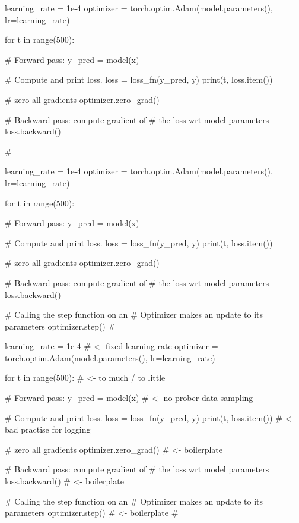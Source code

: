 \documentclass{beamer}
\begin{document}
\begin{frame}[fragile ]
\begin{pythoncode}
learning_rate = 1e-4
optimizer = torch.optim.Adam(model.parameters(), lr=learning_rate)

for t in range(500):

  # Forward pass: 
  y_pred = model(x)

  # Compute and print loss.
  loss = loss_fn(y_pred, y)
  print(t, loss.item())
  
  # zero all gradients
  optimizer.zero_grad()

  # Backward pass: compute gradient of 
  # the loss wrt model parameters
  loss.backward()




#
\end{pythoncode}
\vfill
\end{frame}

\begin{frame}[fragile ]
\begin{pythoncode}
learning_rate = 1e-4
optimizer = torch.optim.Adam(model.parameters(), lr=learning_rate)

for t in range(500):

  # Forward pass: 
  y_pred = model(x)

  # Compute and print loss.
  loss = loss_fn(y_pred, y)
  print(t, loss.item())
  
  # zero all gradients
  optimizer.zero_grad()

  # Backward pass: compute gradient of 
  # the loss wrt model parameters
  loss.backward()

  # Calling the step function on an 
  # Optimizer makes an update to its parameters
  optimizer.step()
#
\end{pythoncode}
\vfill
\end{frame}

\begin{frame}[fragile ]
\begin{pythoncode}
learning_rate = 1e-4         # <- fixed learning rate
optimizer = torch.optim.Adam(model.parameters(), lr=learning_rate)

for t in range(500):         # <- to much / to little 

  # Forward pass: 
  y_pred = model(x)         # <- no prober data sampling

  # Compute and print loss.
  loss = loss_fn(y_pred, y)
  print(t, loss.item())     # <- bad practise for logging
  
  # zero all gradients
  optimizer.zero_grad()     # <- boilerplate

  # Backward pass: compute gradient of 
  # the loss wrt model parameters
  loss.backward()           # <- boilerplate

  # Calling the step function on an 
  # Optimizer makes an update to its parameters
  optimizer.step()          # <- boilerplate
#
\end{pythoncode}
\vfill
\end{frame}
\end{document}
